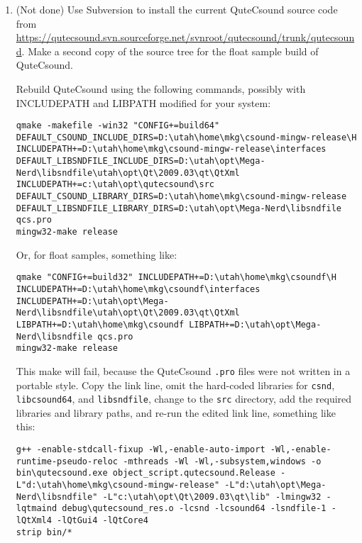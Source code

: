 \documentclass[11pt,letterpaper,onecolumn]{scrartcl}
\begin{document}
\begin{sloppypar}
\begin{enumerate}
\begin{enumerate}
\begin{enumerate}
\begin{enumerate}
			\item (Not done) Use Subversion to install the current QuteCsound source code from \url{https://qutecsound.svn.sourceforge.net/svnroot/qutecsound/trunk/qutecsound}. Make a second copy of the source tree for the float sample build of QuteCsound.
			
			Rebuild QuteCsound using the following commands, possibly with INCLUDEPATH and LIBPATH modified for your system:
			
			\begin{lstlisting}
qmake -makefile -win32 "CONFIG+=build64" DEFAULT_CSOUND_INCLUDE_DIRS=D:\utah\home\mkg\csound-mingw-release\H INCLUDEPATH+=D:\utah\home\mkg\csound-mingw-release\interfaces DEFAULT_LIBSNDFILE_INCLUDE_DIRS=D:\utah\opt\Mega-Nerd\libsndfile\utah\opt\Qt\2009.03\qt\QtXml INCLUDEPATH+=c:\utah\opt\qutecsound\src  DEFAULT_CSOUND_LIBRARY_DIRS=D:\utah\home\mkg\csound-mingw-release DEFAULT_LIBSNDFILE_LIBRARY_DIRS=D:\utah\opt\Mega-Nerd\libsndfile qcs.pro
mingw32-make release
			\end{lstlisting}
			
			\noindent Or, for float samples, something like:
			
			\begin{lstlisting}
qmake "CONFIG+=build32" INCLUDEPATH+=D:\utah\home\mkg\csoundf\H INCLUDEPATH+=D:\utah\home\mkg\csoundf\interfaces INCLUDEPATH+=D:\utah\opt\Mega-Nerd\libsndfile\utah\opt\Qt\2009.03\qt\QtXml LIBPATH+=D:\utah\home\mkg\csoundf LIBPATH+=D:\utah\opt\Mega-Nerd\libsndfile qcs.pro
mingw32-make release
			\end{lstlisting}
			
			\noindent This make will fail, because the QuteCsound \texttt{.pro} files were not written in a portable style. Copy the link line, omit the hard-coded libraries for \texttt{csnd}, \texttt{libcsound64}, and \texttt{libsndfile}, change to the \texttt{src} directory, add the required libraries and library paths, and re-run the edited link line, something like this:
			
			\begin{lstlisting}
g++ -enable-stdcall-fixup -Wl,-enable-auto-import -Wl,-enable-runtime-pseudo-reloc -mthreads -Wl -Wl,-subsystem,windows -o bin\qutecsound.exe object_script.qutecsound.Release -L"d:\utah\home\mkg\csound-mingw-release" -L"d:\utah\opt\Mega-Nerd\libsndfile" -L"c:\utah\opt\Qt\2009.03\qt\lib" -lmingw32 -lqtmaind debug\qutecsound_res.o -lcsnd -lcsound64 -lsndfile-1 -lQtXml4 -lQtGui4 -lQtCore4
strip bin/*	
			\end{lstlisting}
			

\end{enumerate}
\end{enumerate}
\end{enumerate}
\end{enumerate}
\end{sloppypar}
\end{document}
